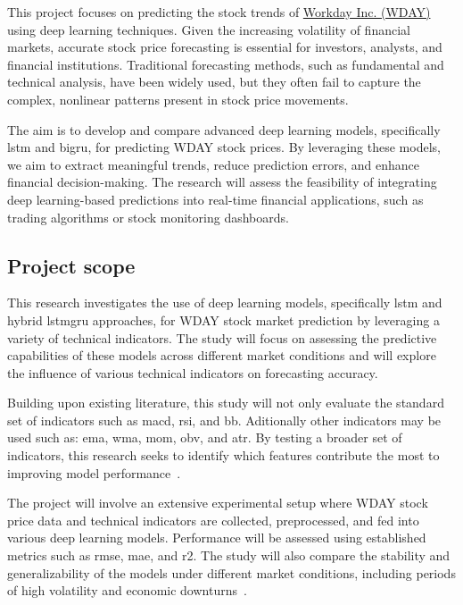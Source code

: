 This project focuses on predicting the stock trends of 
\href{https://www.nasdaq.com/market-activity/stocks/wday}{Workday Inc. (WDAY)} using deep learning techniques. 
Given the increasing volatility of financial markets, accurate stock price forecasting is essential for
investors, analysts, and financial institutions. Traditional forecasting methods, such as fundamental and
technical analysis, have been widely used, but they often fail to capture the complex, nonlinear patterns 
present in stock price movements.

The aim is to develop and compare advanced deep learning models, specifically \acrfull{lstm} 
and \acrfull{bigru}, for predicting WDAY stock prices. By leveraging these models, we aim to extract meaningful
trends, reduce prediction errors, and enhance financial decision-making. The research will assess the feasibility
of integrating deep learning-based predictions into real-time financial applications, such as trading algorithms
or stock monitoring dashboards.

\subsection{Project scope}

This research investigates the use of deep learning models, specifically \acrshort{lstm} and hybrid 
\acrfull{lstmgru} approaches, for WDAY stock market prediction by leveraging a variety of technical
indicators. The study will focus on assessing the predictive capabilities of these models across different market
conditions and will explore the influence of various technical indicators on forecasting accuracy.

Building upon existing literature, this study will not only evaluate the standard set of indicators such as 
\acrfull{macd}, \acrfull{rsi}, and \acrfull{bb}. Aditionally other indicators may be used such as: 
\acrfull{ema}, \acrfull{wma}, \acrfull{mom}, \acrfull{obv}, and \acrfull{atr}. By testing a broader set of
indicators, this research seeks to identify which features contribute the most to improving model 
performance~\parencite{parmar2018stock, nabipour2020DeepLearning}.

The project will involve an extensive experimental setup where WDAY stock price data and technical indicators 
are collected, preprocessed, and fed into various deep learning models. Performance will be assessed using 
established metrics such as \acrfull{rmse}, \acrfull{mae}, and \acrfull{r2}. The study will also compare the 
stability and generalizability of the models under different market conditions, including periods of high
volatility and economic downturns~\parencite{chang2024StockPrediction, phuoc2024StockPrediction}.

